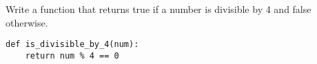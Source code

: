 \begin{blocksection}
\question Write a function that returns true if a number is divisible by 4 and false otherwise.




\vspace{2in}



\begin{solution}[1in]
\begin{lstlisting}
def is_divisible_by_4(num):
    return num % 4 == 0
\end{lstlisting}
\end{solution}
\end{blocksection}
